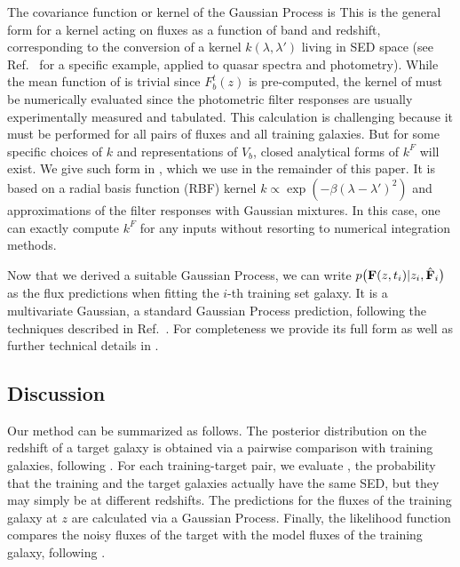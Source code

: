 \documentclass[aps,prd,showpacs,superscriptaddress,groupedaddress]{revtex4}  %
\begin{document}
The covariance function or kernel of the Gaussian Process is
This is the general form for a kernel acting on fluxes as a function of band and redshift, corresponding to the conversion of a kernel $k(\lambda, \lambda')$ living in SED space (see Ref.~\cite{Miller:2015:gpqso} for a specific example, applied to quasar spectra and photometry).
While the mean function of  is trivial since $F^t_b(z)$ is pre-computed, the kernel of  must be numerically evaluated since the photometric filter responses are usually experimentally measured and tabulated. 
This calculation is challenging because it must be performed for all pairs of fluxes and all training galaxies. 
But for some specific choices of $k$ and representations of $V_b$, closed analytical forms of $k^F$ will exist. 
We give such form in , which we use in the remainder of this paper. 
It is based on a radial basis function (RBF) kernel $k\propto \exp(-\beta(\lambda-\lambda')^2)$ and approximations of the filter responses with Gaussian mixtures.
In this case, one can exactly compute $k^F$ for any inputs without resorting to numerical integration methods.

Now that we derived a suitable Gaussian Process, we can write $p\bigl( \mat{F}(z,t_i) | z_i, \hat{\mat{F}}_i\bigr)$ as the flux predictions when fitting the $i$-th training set galaxy. 
It is a multivariate Gaussian, a standard Gaussian Process prediction, \eg following the techniques described in Ref.~\cite{Rasmussen:2005}. 
For completeness we provide its full form as well as further technical details in .



\subsection{Discussion}\label{sec:discussion}

Our method can be summarized as follows.
The posterior distribution on the redshift of a target galaxy is obtained via a pairwise comparison with training galaxies, following . 
For each training-target pair, we evaluate , the probability that the training and the target galaxies actually have the same SED, but they may simply be at different redshifts.
The predictions for the fluxes of the training galaxy at $z$ are calculated via a Gaussian Process. 
Finally, the likelihood function compares the noisy fluxes of the target with the model fluxes of the training galaxy, following .
\end{document}
